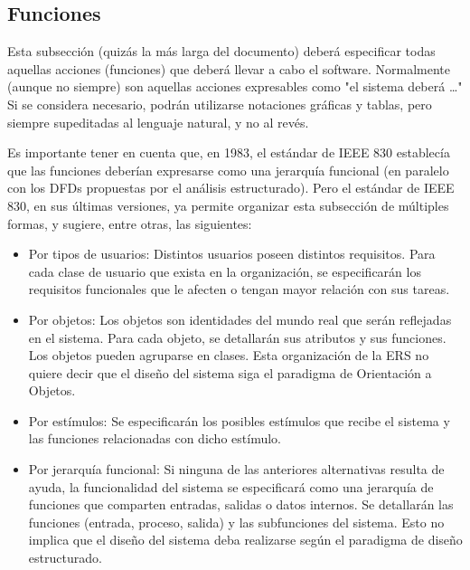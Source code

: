 \documentclass[12pt,a4paper, twosite]{book}
\begin{document}
\subsection{Funciones}
\label{sec:org307bb59}

Esta subsección (quizás la más larga del documento) deberá
especificar todas aquellas acciones (funciones) que deberá llevar a
cabo el software. Normalmente (aunque no siempre) son aquellas
acciones expresables como "el sistema deberá \ldots{}" Si se considera
necesario, podrán utilizarse notaciones gráficas y tablas, pero
siempre supeditadas al lenguaje natural, y no al revés.

Es importante tener en cuenta que, en 1983, el estándar de IEEE 830
establecía que las funciones deberían expresarse como una jerarquía
funcional (en paralelo con los DFDs propuestas por el análisis
estructurado). Pero el estándar de IEEE 830, en sus últimas
versiones, ya permite organizar esta subsección de múltiples formas,
y sugiere, entre otras, las siguientes:


\begin{itemize}
\item Por tipos de usuarios: 
    Distintos usuarios poseen distintos requisitos. Para cada clase de
usuario que exista en la organización, se especificarán los
requisitos funcionales que le afecten o tengan mayor relación con
sus tareas.
\end{itemize}


\begin{itemize}
\item Por objetos:
   Los objetos son identidades del mundo real que serán reflejadas en
el sistema. Para cada objeto, se detallarán sus atributos y sus
funciones. Los objetos pueden agruparse en clases. Esta organización
de la ERS no quiere decir que el diseño del sistema siga el
paradigma de Orientación a Objetos.
\end{itemize}


\begin{itemize}
\item Por estímulos: 
  Se especificarán los posibles estímulos que recibe el sistema y las
funciones relacionadas con dicho estímulo.
\end{itemize}


\begin{itemize}
\item Por jerarquía funcional: 
   Si ninguna de las anteriores alternativas resulta de ayuda, la
funcionalidad del sistema se especificará como una jerarquía de
funciones que comparten entradas, salidas o datos internos. Se
detallarán las funciones (entrada, proceso, salida) y las
subfunciones del sistema. Esto no implica que el diseño del sistema
deba realizarse según el paradigma de diseño estructurado.
\end{itemize}
\end{document}
